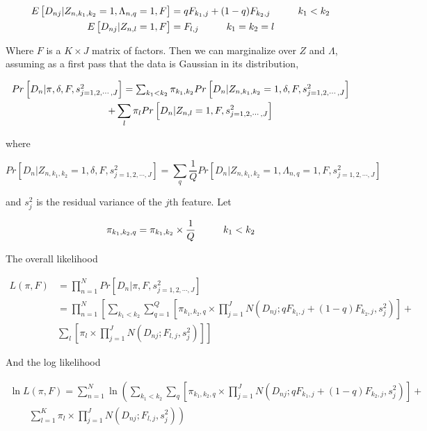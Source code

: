 \documentclass[11pt,authoryear]{article}
\begin{document}
\begin{align}
 E \left [ D_{nj} | Z_{n, k_1, k_2} = 1, \Lambda_{n,q}=1, F \right] &= q
  F_{k_1,j} + (1-q) F_{k_2,j} \hspace{1 cm} k_1<k_2 \nonumber \\
 E \left [ D_{nj} | Z_{n,l} = 1, F \right] &= F_{l,j} \hspace{1 cm} k_1 = k_2 = l 
\end{align}

Where $F$ is a $K\times J$ matrix of factors. 
Then we can marginalize over $Z$ and $\Lambda$, assuming as a first pass 
that the data is Gaussian in its distribution,

\begin{multline}
 $$ Pr \left [ D_{n} | \pi, \delta, F, s^2_{j=1,2,\cdots,J} \right ] = \sum_{k_1 < k_2}
 \pi_{k_1, k_2} Pr \left [ D_{n} | Z_{n, k_1, k_2}=1, \delta, F, s^2_{j=1,2,\cdots,J} \right ]  \\
   \qquad +  \sum_{l} \pi_{l} Pr \left [ D_{n} | Z_{n, l}=1,  F, s^2_{j=1,2,\cdots,J} \right ]$$
 \end{multline}

where 

$$ Pr \left [ D_{n} | Z_{n, k_1, k_2}=1, \delta, F, s^2_{j=1,2,\cdots,J} \right ] = \sum_{q} \frac{1}{Q} Pr \left [D_{n} | Z_{n, k_1, k_2}=1, \Lambda_{n, q}=1, F, s^2_{j=1,2,\cdots,J} \right ] $$

and $s^2_{j}$ is the residual variance of the $j$th feature. Let

$$\pi_{k_1, k_2, q} = \pi_{k_1, k_2}\times\frac{1}{Q} \hspace{1 cm} k_1 < k_2$$

The overall likelihood 

\begin{align}
L(\pi, F) &= \prod_{n=1}^{N} Pr \left [ D_{n} | \pi, F, s^2_{j=1,2,\cdots,J}
\right ] \nonumber \\
 &= \prod_{n=1}^{N} \left [ \sum_{k_1 < k_2} \sum_{q=1}^{Q} \left [\pi_{k_1,k_2,q} \times \prod_{j=1}^{J} N \left (D_{nj}; q F_{k_1,j} + (1-q) F_{k_2, j}, s^2_{j} \right) \right ] + \right.\nonumber \\
 & \left. \sum_{l} \left [ \pi_{l} \times \prod_{j=1}^{J} N \left (D_{nj}; F_{l,j} , s^2_{j} \right) \right ] \right]
\end{align}

And the log likelihood

\begin{multline}
\ln {L (\pi, F)} = \sum_{n=1}^{N} \ln \left (\sum_{k_1 < k_2} \sum_{q} \left [ \pi_{k_1,k_2, q} \times \prod_{j=1}^{J} N \left (D_{nj}; q F_{k_1,j} + (1-q) F_{k_2, j}, s^2_{j} \right) \right ] + \right . \\
\left. \qquad \sum_{l=1}^{K} \pi_{l}  \times \prod_{j=1}^{J} N \left (D_{nj}; F_{l,j}, s^2_{j} \right)\right )
\end{multline}
\end{document}
